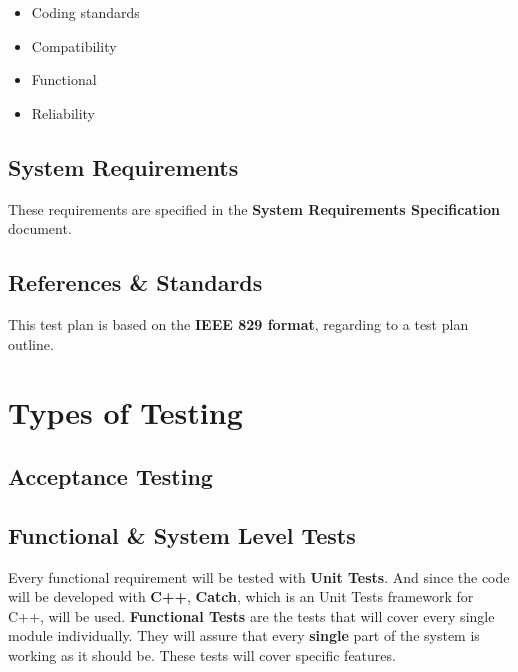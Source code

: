 \documentclass[12pt]{article}
\begin{document}
\begin{itemize}  
\item Coding standards
\item Compatibility 
\item Functional 
\item Reliability
\end{itemize}

\subsection*{System Requirements}

These requirements are specified in the \textbf{System Requirements Specification} document.

\subsection*{References \& Standards}

This test plan is based on the \textbf{IEEE 829 format}, regarding to a test plan outline. 

\section*{Types of Testing}

\subsection*{Acceptance Testing}

\subsection*{Functional \& System Level Tests}

Every functional requirement will be tested with \textbf{Unit Tests}. And since the code will be developed with \textbf{C++}, \textbf{Catch}, which is an Unit Tests framework for C++, will be used. 
\textbf{Functional Tests} are the tests that will cover every single module individually. They will assure that every \textbf{single} part of the system is working as it should be. These tests will cover specific features.
\end{document}
